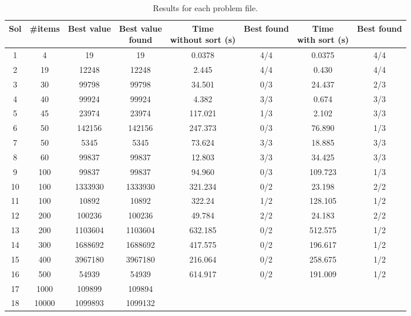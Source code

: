 \documentclass[anon]{CI}
\begin{document}
\begin{table}[!htbp]
\centering
\begin{adjustbox}{max width=\textwidth}
\begin{tabular}{|c|c|c|c|c|c|c|c|}
\hline 
Sol & \#items & Best value & \makecell{Best value\\found} & \makecell{Time\\without sort (s)} & Best found & \makecell{Time\\with sort (s)} & Best found\\
\hline 
1 & 4 & 19  & 19  & 0.0378 & 4/4 & 0.0375 & 4/4\\
\hline 
2 & 19 & 12248 & 12248 & 2.445 & 4/4 & 0.430 & 4/4\\
\hline 
3 & 30 & 99798  & 99798  & 34.501 & 0/3 & 24.437 & 2/3\\
\hline 
4 & 40 & 99924  & 99924  & 4.382 & 3/3 & 0.674 & 3/3\\
\hline 
5 & 45 & 23974  & 23974  & 117.021 & 1/3 & 2.102 & 3/3\\
\hline 
6 & 50 & 142156  & 142156  & 247.373 & 0/3 & 76.890 & 1/3\\
\hline 
7 & 50 & 5345  & 5345  & 73.624 & 3/3 & 18.885 & 3/3\\
\hline 
8 & 60 & 99837  & 99837  & 12.803 & 3/3 & 34.425 & 3/3\\
\hline 
9 & 100 & 99837  & 99837  & 94.960 & 0/3 & 109.723 & 1/3\\
\hline 
10 & 100 & 1333930  & 1333930  & 321.234 & 0/2 & 23.198 & 2/2\\
\hline 
11 & 100 & 10892  & 10892  & 322.24 & 1/2 & 128.105 & 1/2\\
\hline 
12 & 200 & 100236  & 100236  & 49.784 & 2/2 & 24.183 & 2/2\\
\hline 
13 & 200 & 1103604  & 1103604  & 632.185 & 0/2 & 512.575 & 1/2\\
\hline 
14 & 300 & 1688692  & 1688692  & 417.575 & 0/2 & 196.617 & 1/2\\
\hline 
15 & 400 & 3967180  & 3967180  & 216.064 & 0/2 & 258.675 & 1/2\\
\hline 
16 & 500 & 54939  & 54939  & 614.917 & 0/2 & 191.009 & 1/2\\
\hline 
17 & 1000 & 109899 & 109894 &  &  &  & \\
\hline 
18 & 10000 & 1099893 & 1099132 &  &  &  & \\
\hline 
\end{tabular}
\par\end{adjustbox}
\caption{Results for each problem file.}
\label{tab:results}

\end{table}
\end{document}
